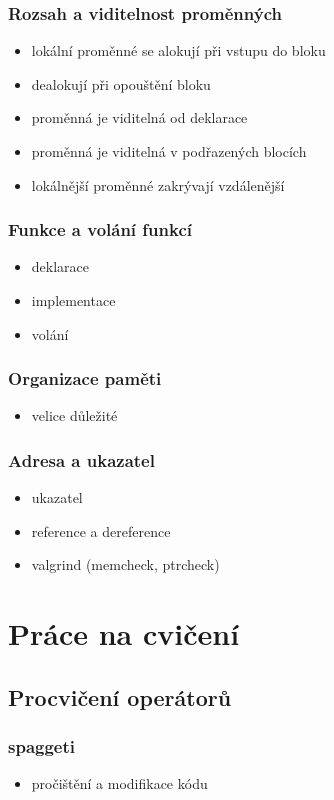 \begin{frame}
	\frametitle{Rozsah a viditelnost proměnných}
	\begin{itemize}
		\item{lokální proměnné se alokují při vstupu do bloku}
		\item{dealokují při opouštění bloku}
		\item{proměnná je viditelná od deklarace}
		\item{proměnná je viditelná v podřazených blocích}
		\item{lokálnější proměnné zakrývají vzdálenější}
	\end{itemize}
\end{frame}

\begin{frame}
	\frametitle{Funkce a volání funkcí}
	\begin{itemize}
		\item{deklarace}
		\item{implementace}
		\item{volání}
	\end{itemize}
\end{frame}

\begin{frame}
	\frametitle{Organizace paměti}
	\begin{itemize}
		\item{velice důležité}
	\end{itemize}
\end{frame}

\begin{frame}
	\frametitle{Adresa a ukazatel}
	\begin{itemize}
		\item{ukazatel}
		\item{reference a dereference}
		\item{valgrind (memcheck, ptrcheck)}
	\end{itemize}
\end{frame}

\section{Práce na cvičení}
\subsection{Procvičení operátorů}

\begin{frame}
	\frametitle{spaggeti}
	\begin{itemize}
		\item{pročištění a modifikace kódu}
	\end{itemize}
\end{frame}

